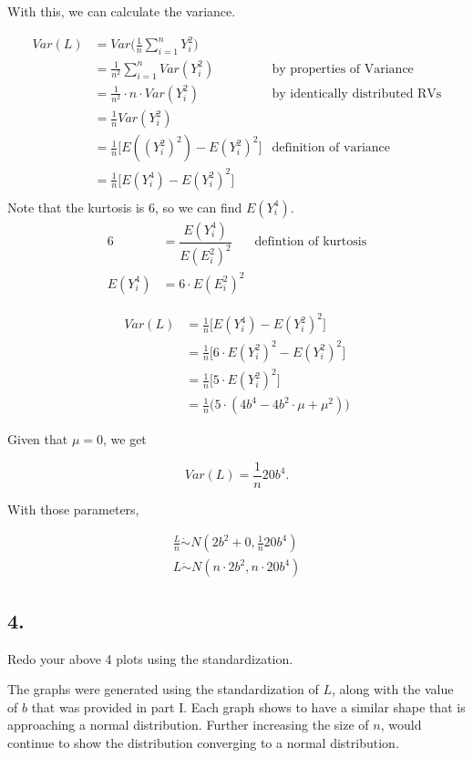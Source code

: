 \documentclass[12pt]{article}
\begin{document}
With this, we can calculate the variance.

\begin{align*}
	Var(L)  & = Var \Big( \frac{ 1 }{ n } \sum_{i = 1}^{n} Y_i^2 \Big) \\
		& = \frac{ 1 }{ n^2 } \sum_{i = 1}^{n} Var(  Y_i^2)  & \text{by properties of Variance}\\
		& =  \frac{ 1 }{ n^2 }\cdot  n \cdot Var(  Y_i^2) & \text{by identically distributed RVs}\\
		& = \frac{ 1 }{ n }Var(Y_i^2) \\
		& = \frac{ 1 }{ n } \Big[ E( (Y_i^2)^2) - E(Y_i^2)^2  \Big] & \text{definition of variance} \\
		& = \frac{ 1 }{ n } \Big[ E( Y_i^4) - E(Y_i^2)^2  \Big] \\
\end{align*}
Note that the kurtosis is 6, so we can find  $E(Y_i^4)$.
\begin{align*}
	6 & = \dfrac{E(Y_i^4)}{E(E_i^2)^2} & \text{defintion of kurtosis} \\
	E(Y_i^4) & = 6 \cdot E(E_i^2)^2
\end{align*}

\begin{align*}
Var(L) & =  \frac{ 1 }{ n } \Big[ E( Y_i^4) - E(Y_i^2)^2  \Big] \\
	& =  \frac{ 1 }{ n } \Big[ 6 \cdot E(Y_i^2)^2 - E(Y_i^2)^2  \Big] \\
	& =  \frac{ 1 }{ n } \Big[ 5 \cdot E(Y_i^2)^2  \Big] \\
	& = \frac{ 1 }{ n } \Big( 5\cdot (4b^4 - 4b^2\cdot \mu + \mu^2 ) \Big)
\end{align*}

Given that $\mu = 0$, we get

$$Var(L)  = \frac{ 1 }{ n } 20b^4.$$

With those parameters, 

\begin{align*}
	\frac{ L }{ n } \dot{\sim} N(2b^2+0, \frac{ 1 }{ n } 20b^4)\\
	L \dot{\sim} N ( n\cdot 2b^2, n\cdot 20b^4)
\end{align*}

\subsection{4.}
Redo your above 4 plots using the standardization.

The graphs were generated using the standardization of $L$, along with the value of $b$ that was provided in part I. Each graph shows to have a similar shape that is approaching a normal distribution. Further increasing the size of $n$, would continue to show the distribution converging to a normal distribution. 
\end{document}
